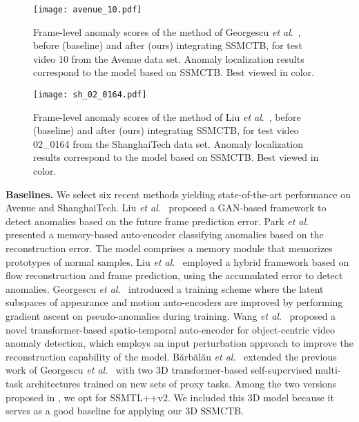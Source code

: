 \documentclass[10pt,journal,compsoc]{IEEEtran}
\newcommand{\etal}{\textit{et al}.}
\begin{document}
\begin{figure}[t]
\begin{center}
\centerline{\texttt{[image: avenue\_10.pdf]}}
\vspace{-0.2cm}
\caption{Frame-level anomaly scores of the method of Georgescu \etal~\cite{Georgescu-TPAMI-2021}, before (baseline) and after (ours) integrating SSMCTB, for test video 10 from the Avenue data set. Anomaly localization results correspond to the model based on SSMCTB. Best viewed in color.}
\label{fig_results_avenue_2}
\vspace{-0.2cm}
\end{center}
\end{figure}

\begin{figure}[t]
\begin{center}
\centerline{\texttt{[image: sh\_02\_0164.pdf]}}
\vspace{-0.2cm}
\caption{Frame-level anomaly scores of the method of Liu 
\etal~\cite{Liu-ICCV-2021}, before (baseline) and after (ours) integrating SSMCTB, for test video 02\_0164 from the ShanghaiTech data set. Anomaly localization results correspond to the model based on SSMCTB. Best viewed in color.}
\label{fig_results_shtech}
\vspace{-0.2cm}
\end{center}
\end{figure}

\noindent
\textbf{Baselines.}
We select six recent methods \cite{Liu-CVPR-2018,Park-CVPR-2020,Georgescu-TPAMI-2021,Liu-ICCV-2021, Barbalau-ARXIV-2022,Wang-ICDM-2022} yielding state-of-the-art performance on Avenue and ShanghaiTech. 
Liu \etal~\cite{Liu-CVPR-2018} proposed a GAN-based framework to detect anomalies based on the future frame prediction error. 
Park \etal~\cite{Park-CVPR-2020} presented a memory-based auto-encoder classifying anomalies based on the reconstruction error. The model comprises a memory module that memorizes prototypes of normal samples. 
Liu \etal~\cite{Liu-ICCV-2021} employed a hybrid framework based on flow reconstruction and frame prediction, using the accumulated error to detect anomalies. 
Georgescu \etal~\cite{Georgescu-TPAMI-2021} introduced a training scheme where the latent subspaces of appearance and motion auto-encoders are improved by performing gradient ascent on pseudo-anomalies during training. Wang \etal~\cite{Wang-ICDM-2022} proposed a novel transformer-based spatio-temporal auto-encoder for
object-centric video anomaly detection, which employs an input perturbation approach to improve the reconstruction capability of the model. B\u{a}rb\u{a}l\u{a}u \etal~\cite{Barbalau-ARXIV-2022} extended the previous work of Georgescu \etal~\cite{Georgescu-CVPR-2021} with two 3D transformer-based self-supervised multi-task architectures trained on new sets of proxy tasks. Among the two versions proposed in \cite{Barbalau-ARXIV-2022}, we opt for SSMTL++v2. We included this 3D model \cite{Barbalau-ARXIV-2022} because it serves as a good baseline for applying our 3D SSMCTB. 
\end{document}

